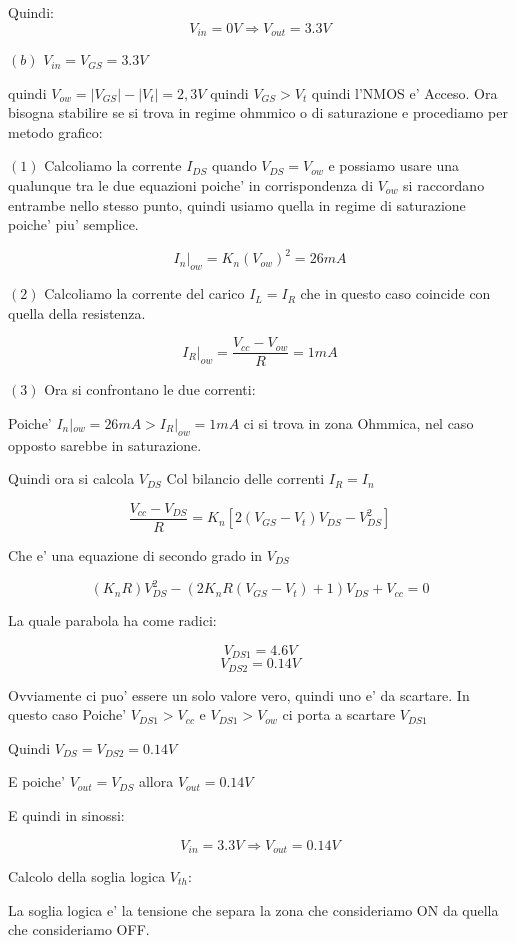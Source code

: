 \documentclass[\main/main.tex]{subfiles}
\begin{document}
Quindi:
 \[V_{in} = 0V \Rightarrow V_{out} = 3.3V\]
 

$(b)$ $V_{in} = V_{GS} = 3.3V$

quindi $V_{ow} = |V_{GS}| - |V_t| = 2,3V$ quindi $V_{GS} > V_t$ quindi l'NMOS e' Acceso.
Ora bisogna stabilire se si trova in regime ohmmico o di saturazione e procediamo per metodo grafico:

$(1)$ Calcoliamo la corrente $I_{DS}$ quando $V_{DS} = V_{ow}$ e possiamo usare una qualunque tra le due equazioni poiche' in corrispondenza di $V_{ow}$ si raccordano entrambe nello stesso punto, quindi usiamo quella in regime di saturazione poiche' piu' semplice.

\[I_n|_{ow} = K_n \left(V_{ow}\right)^2 = 26mA\]

$(2)$ Calcoliamo la corrente del carico $I_{L} = I_{R}$ che in questo caso coincide con quella della resistenza.

\[I_R|_{ow} = \frac{V_{cc} - V_{ow}}{R} = 1mA\]

$(3)$ Ora si confrontano le due correnti:

Poiche' $I_n|_{ow} = 26mA > I_R|_{ow} = 1mA$ ci si trova in zona Ohmmica, nel caso opposto sarebbe in saturazione.

Quindi ora si calcola $V_{DS}$ Col bilancio delle correnti $I_R = I_n$

\[\frac{V_{cc} - V_{DS}}{R} = K_n \left[ 2 \left(V_{GS} - V_t \right)V_{DS} - V_{DS}^2 \right]\]

Che e' una equazione di secondo grado in $V_{DS}$ 

\[\left(K_n R \right) V_{DS}^2 - \left(2K_nR\left(V_{GS}-V_t\right)+1\right)V_{DS}+V_{cc} = 0\]

La quale parabola ha come radici:

\[V_{DS1} = 4.6V\]
\[V_{DS2} = 0.14V\]

Ovviamente ci puo' essere un solo valore vero, quindi uno e' da scartare.
In questo caso Poiche' $V_{DS1} > V_{cc}$ e $V_{DS1} > V_{ow}$ ci porta a scartare $V_{DS1}$

Quindi $V_{DS} = V_{DS2} = 0.14V$

E poiche' $V_{out} = V_{DS}$ allora $V_{out} = 0.14V$

E quindi in sinossi:

\[V_{in} = 3.3V \Rightarrow V_{out} = 0.14V\]

Calcolo della soglia logica $V_{th}$:

La soglia logica e' la tensione che separa la zona che consideriamo ON da quella che consideriamo OFF.
\end{document}
